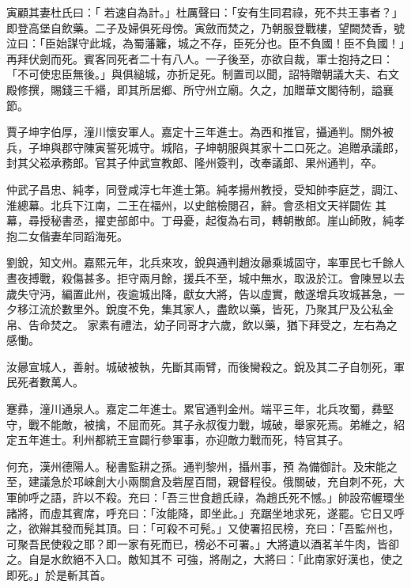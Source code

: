 \begin{pinyinscope}
 寅顧其妻杜氏曰：「
 若速自為計。」杜厲聲曰：「安有生同君祿，死不共王事者？」即登高堡自飲藥。二子及婦俱死母傍。寅斂而焚之，乃朝服登戰樓，望闕焚香，號泣曰：「臣始謀守此城，為蜀藩籬，城之不存，臣死分也。臣不負國！臣不負國！」再拜伏劍而死。賓客同死者二十有八人。一子後至，亦欲自裁，軍士抱持之曰：「不可使忠臣無後。」與俱縋城，亦折足死。制置司以聞，詔特贈朝議大夫、右文殿修撰，賜錢三千緡，即其所居鄉、所守州立廟。久之，加贈華文閣待制，謚襄
 節。



 賈子坤字伯厚，潼川懷安軍人。嘉定十三年進士。為西和推官，攝通判。關外被兵，子坤與郡守陳寅誓死城守。城陷，子坤朝服與其家十二口死之。追贈承議郎，封其父崧承務郎。官其子仲武宣教郎、隆州簽判，改奉議郎、果州通判，卒。



 仲武子昌忠、純孝，同登咸淳七年進士第。純孝揚州教授，受知帥李庭芝，調江、淮總幕。北兵下江南，二王在福州，以史館檢閱召，辭。會丞相文天祥闢佐
 其幕，尋授秘書丞，擢吏部郎中。丁母憂，起復為右司，轉朝散郎。崖山師敗，純孝抱二女偕妻牟同蹈海死。



 劉銳，知文州。嘉熙元年，北兵來攻，銳與通判趙汝曏乘城固守，率軍民七千餘人晝夜搏戰，殺傷甚多。拒守兩月餘，援兵不至，城中無水，取汲於江。會陳昱以去歲失守沔，編置此州，夜逾城出降，獻女大將，告以虛實，敵遂增兵攻城甚急，一夕移江流於數里外。銳度不免，集其家人，盡飲以藥，皆死，乃聚其尸及公私金帛、告命焚之。
 家素有禮法，幼子同哥才六歲，飲以藥，猶下拜受之，左右為之感慟。



 汝曏宣城人，善射。城破被執，先斷其兩臂，而後臠殺之。銳及其二子自刎死，軍民死者數萬人。



 蹇彞，潼川通泉人。嘉定二年進士。累官通判金州。端平三年，北兵攻蜀，彞堅守，戰不能敵，被擒，不屈而死。其子永叔復力戰，城破，舉家死焉。弟維之，紹定五年進士。利州都統王宣闢行參軍事，亦迎敵力戰而死，特官其子。



 何充，漢州德陽人。秘書監耕之孫。通判黎州，攝州事，預
 為備御計。及宋能之至，建議急於邛崍創大小兩關倉及砦屋百間，親督程役。俄關破，充自刺不死，大軍帥呼之語，許以不殺。充曰：「吾三世食趙氏祿，為趙氏死不憾。」帥設帟幄環坐諸將，而虛其賓席，呼充曰：「汝能降，即坐此。」充踞坐地求死，遂罷。它日又呼之，欲辮其發而髡其頂。曰：「可殺不可髡。」又使署招民榜，充曰：「吾監州也，可聚吾民使殺之耶？即一家有死而已，榜必不可署。」大將遺以酒茗羊牛肉，皆卻之。自是水飲絕不入口。敵知其不
 可強，將剮之，大將曰：「此南家好漢也，使之即死。」於是斬其首。




\end{pinyinscope}
